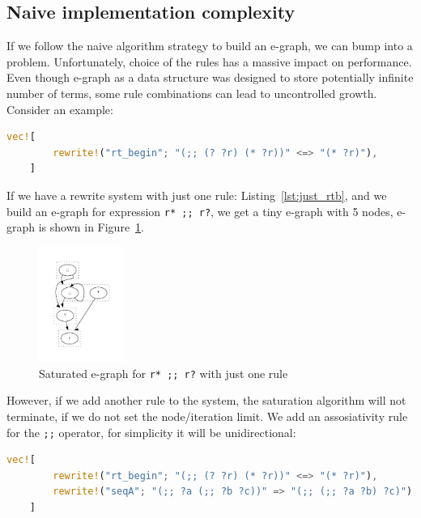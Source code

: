 \subsection{Naive implementation complexity}
If we follow the naive algorithm strategy to build an e-graph, we can bump into a problem. Unfortunately, choice of the rules has a massive impact on performance. Even though e-graph as a data structure was designed to store potentially infinite number of terms, some rule combinations can lead to uncontrolled growth. Consider an example: 
 
\vspace{0.5cm}
\begin{lstlisting}[language=rust, style=colouredRust, label=lst:just_rtb]
    vec![
        rewrite!("rt_begin"; "(;; (? ?r) (* ?r))" <=> "(* ?r)"),
    ]
\end{lstlisting}

If we have a rewrite system with just one rule: Listing~\ref{lst:just_rtb}, and we build an e-graph for expression \texttt{r* {;;} r?}, we get a tiny e-graph with 5 nodes, e-graph is shown in Figure~\ref{fig:just_rtb}.

\begin{figure}[h]
    \centering
    \includegraphics[width=0.25\textwidth]{img/rules_important_egraph1.pdf}
    \caption{Saturated e-graph for \texttt{r* {;;} r?} with just one rule}\label{fig:just_rtb}
\end{figure}

However, if we add another rule to the system, the saturation algorithm will not terminate, if we do not set the node/iteration limit. We add an assosiativity rule for the \texttt{;;} operator, for simplicity it will be unidirectional:

\vspace{0.5cm}
\begin{lstlisting}[language=rust, style=colouredRust, label=lst:just_rtb]
    vec![
        rewrite!("rt_begin"; "(;; (? ?r) (* ?r))" <=> "(* ?r)"),
        rewrite!("seqA"; "(;; ?a (;; ?b ?c))" => "(;; (;; ?a ?b) ?c)"),
    ]
\end{lstlisting}

